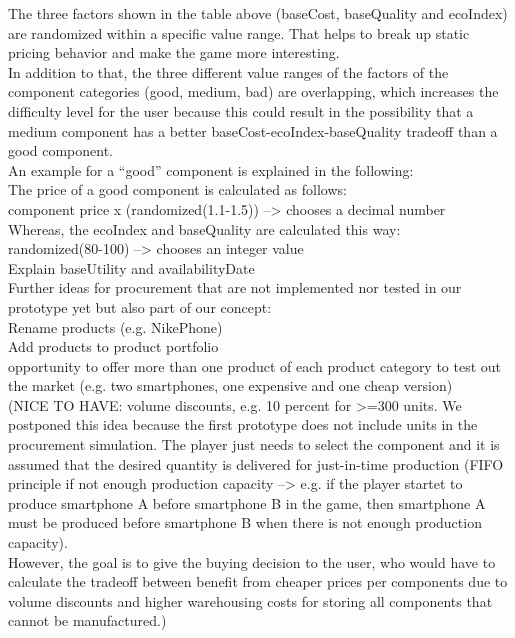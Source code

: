 \documentclass[11pt,titlepage,oneside,openany]{book}
\begin{document}
The three factors shown in the table above (baseCost, baseQuality and ecoIndex) are randomized within a specific value range. That helps to break up static pricing behavior and make the game more interesting.\\
In addition to that, the three different value ranges of the factors of the component categories (good, medium, bad) are overlapping, which increases the difficulty level for the user because this could result in the possibility that a medium component has a better baseCost-ecoIndex-baseQuality tradeoff than a good component.\\
An example for a “good” component is explained in the following:\\
The price of a good component is calculated as follows:\\
component price x (randomized(1.1-1.5)) --> chooses a decimal number\\
Whereas, the ecoIndex and baseQuality are calculated this way:\\
randomized(80-100) --> chooses an integer value\\

Explain baseUtility and availabilityDate\\

Further ideas for procurement that are not implemented nor tested in our prototype yet but also part of our concept: \\
Rename products (e.g. NikePhone) \\
Add products to product portfolio \\
opportunity to offer more than one product of each product category to test out the market (e.g. two smartphones, one expensive and one cheap version)\\
(NICE TO HAVE: volume discounts, e.g. 10 percent for >=300 units. We postponed this idea because the first prototype does not include units in the procurement simulation. The player just needs to select the component and it is assumed that the desired quantity is delivered for just-in-time production (FIFO principle if not enough production capacity --> e.g. if the player startet to produce smartphone A before smartphone B in the game, then smartphone A must be produced before smartphone B when there is not enough production capacity). \\
However, the goal is to give the buying decision to the user, who would have to calculate the tradeoff between benefit from cheaper prices per components due to volume discounts and higher warehousing costs for storing all components that cannot be manufactured.)
\end{document}
